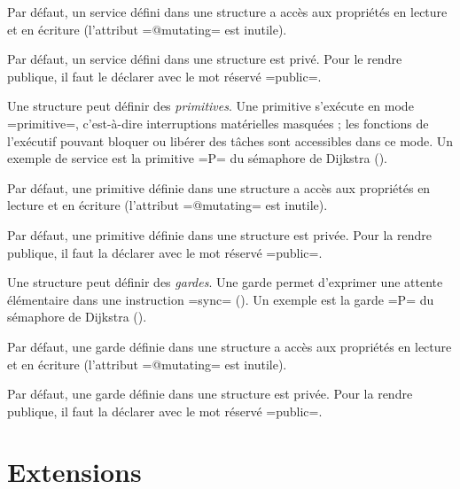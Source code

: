 Par défaut, un service défini dans une structure a accès aux propriétés en lecture et en écriture (l'attribut \omnibus=@mutating= est inutile).

Par défaut, un service défini dans une structure est privé. Pour le rendre publique, il faut le déclarer avec le mot réservé \omnibus=public=.










Une structure peut définir des \emph{primitives}. Une primitive s'exécute en mode \omnibus=primitive=, c'est-à-dire interruptions matérielles masquées ; les fonctions de l'exécutif pouvant bloquer ou libérer des tâches sont accessibles dans ce mode. Un exemple de service est la primitive \omnibus=P= du sémaphore de Dijkstra ().

Par défaut, une primitive définie dans une structure a accès aux propriétés en lecture et en écriture (l'attribut \omnibus=@mutating= est inutile).

Par défaut, une primitive définie dans une structure est privée. Pour la rendre publique, il faut la déclarer avec le mot réservé \omnibus=public=.










Une structure peut définir des \emph{gardes}. Une garde permet d'exprimer une attente élémentaire dans une instruction \omnibus=sync= (). Un exemple est la garde \omnibus=P= du sémaphore de Dijkstra ().

Par défaut, une garde définie dans une structure a accès aux propriétés en lecture et en écriture (l'attribut \omnibus=@mutating= est inutile).

Par défaut, une garde définie dans une structure est privée. Pour la rendre publique, il faut la déclarer avec le mot réservé \omnibus=public=.






\section{Extensions}

